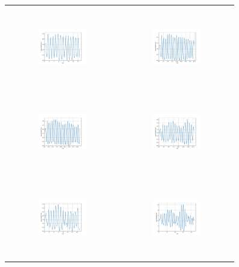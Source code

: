 \begin{figure}[H]
\begin{center}
\begin{tabular}{cc}
\includegraphics[width=0.45\textwidth, height=3.5cm]{graph/omega=2.00_A=1_wave.pdf}
&
\includegraphics[width=0.45\textwidth, height=3.5cm]{graph/omega=2.00_A=2_wave.pdf}\\
\includegraphics[width=0.45\textwidth, height=3.5cm]{graph/omega=2.00_A=3_wave.pdf}
&
\includegraphics[width=0.45\textwidth, height=3.5cm]{graph/omega=2.00_A=4_wave.pdf}\\
\includegraphics[width=0.45\textwidth, height=3.5cm]{graph/omega=2.00_A=5_wave.pdf}
&
\includegraphics[width=0.45\textwidth, height=3.5cm]{graph/omega=2.00_A=6_wave.pdf}\\

\end{tabular}
\end{center}
\end{figure}
